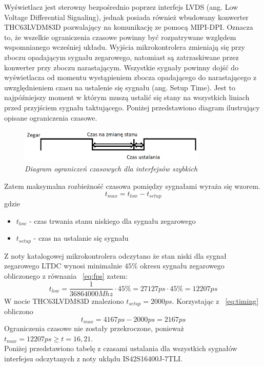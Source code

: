 \documentclass[eng,printmode]{mgr}
\begin{document}
Wyświetlacz jest sterowny bezpośrednio poprzez interfejs LVDS (ang. Low Voltage Differential Signaling), jednak  posiada również wbudowany konwerter THC63LVDM83D pozwalający na komunikację ze pomocą MIPI-DPI. Oznacza to, że wszelkie ograniczenia czasowe powinny być rozpatrywane względem wspomnianego wcześniej układu. 
\newpage
Wyjścia
mikrokontrolera zmieniają się przy zboczu opadającym sygnału zegarowego, natomiast są zatrzaskiwane przez konwerter przy zboczu narastającym. Wszystkie sygnały powinny dojść do wyświetlacza od momentu wystąpieniem zbocza opadającego do narastającego z uwzględnieniem czasu na ustalenie się sygnału (ang. Setup Time). Jest to najpóźniejszy moment w którym muszą ustalić się stany na wszystkich liniach przed przyjściem sygnału taktującego. Poniżej przedstawiono diagram ilustrujący opisane ograniczenia czasowe.

\begin{figure}[thb]
    \centering
    \includegraphics[width=9cm]{plots/timing.png}
    \caption{\textit{Diagram ograniczeń czasowych dla interfejsów szybkich}}
\end{figure}
\noindent
Zatem maksymalna rozbieżność czasowa pomiędzy sygnałami wyraża się wzorem.
\begin{equation}
t_{max} = t_{low}- t_{setup} \label{eq:timing}
\end{equation}
gdzie
\begin{itemize}
  \item \textbf{$t_{low}$} - czas trwania stanu niskiego dla sygnału zegarowego
  \item \textbf{$t_{setup}$} - czas na ustalanie się sygnału
\end{itemize}

Z noty katalogowej mikrokontrolera odczytano że stan niski dla sygnał zegarowego LTDC wynosi minimalnie $45\%$
okresu sygnału zegarowego obliczonego z równania ~\ref{eq:fps} zatem:
$$
t_{low} = \frac{1}{36864000Mhz} \cdot 45\% = 27127ps\cdot45\% = 12207ps
$$
W nocie THC63LVDM83D znaleziono $t_{setup} = 2000ps$. Korzystając z ~\ref{eq:timing} obliczono
$$
t_{max} = 4167ps - 2000ps = 2167ps
$$
Ograniczenia czasowe nie zostały przekroczone, ponieważ $t_{max}= 12207ps \geq t=16,21$.\\

Poniżej przedstawiono tabelę z czasami ustalania dla wszystkich sygnałów interfejsu odczytanych z noty ukłądu IS42S16400J-7TLI.
\end{document}
